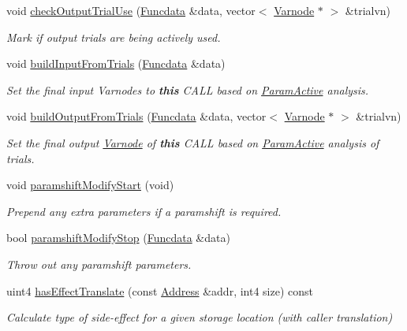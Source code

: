 \begin{DoxyCompactItemize}
void \mbox{\hyperlink{class_func_call_specs_a82c50f8299ce305411880fc61b8b1907}{check\+Output\+Trial\+Use}} (\mbox{\hyperlink{class_funcdata}{Funcdata}} \&data, vector$<$ \mbox{\hyperlink{class_varnode}{Varnode}} $\ast$ $>$ \&trialvn)
\begin{DoxyCompactList}\small\item\em Mark if output trials are being actively used. \end{DoxyCompactList}\item 
void \mbox{\hyperlink{class_func_call_specs_a1bb49b65cf036e8bc8b398e549b26a9c}{build\+Input\+From\+Trials}} (\mbox{\hyperlink{class_funcdata}{Funcdata}} \&data)
\begin{DoxyCompactList}\small\item\em Set the final input Varnodes to {\bfseries{this}} C\+A\+LL based on \mbox{\hyperlink{class_param_active}{Param\+Active}} analysis. \end{DoxyCompactList}\item 
void \mbox{\hyperlink{class_func_call_specs_a15f172165e29fbabfbb02be245ee1c98}{build\+Output\+From\+Trials}} (\mbox{\hyperlink{class_funcdata}{Funcdata}} \&data, vector$<$ \mbox{\hyperlink{class_varnode}{Varnode}} $\ast$ $>$ \&trialvn)
\begin{DoxyCompactList}\small\item\em Set the final output \mbox{\hyperlink{class_varnode}{Varnode}} of {\bfseries{this}} C\+A\+LL based on \mbox{\hyperlink{class_param_active}{Param\+Active}} analysis of trials. \end{DoxyCompactList}\item 
void \mbox{\hyperlink{class_func_call_specs_aac7bcd5ea5ed14adbe74b4ca4c7e0814}{paramshift\+Modify\+Start}} (void)
\begin{DoxyCompactList}\small\item\em Prepend any extra parameters if a paramshift is required. \end{DoxyCompactList}\item 
bool \mbox{\hyperlink{class_func_call_specs_a01e16ebebb71bdc63fb884c8d0e3b7e3}{paramshift\+Modify\+Stop}} (\mbox{\hyperlink{class_funcdata}{Funcdata}} \&data)
\begin{DoxyCompactList}\small\item\em Throw out any paramshift parameters. \end{DoxyCompactList}\item 
uint4 \mbox{\hyperlink{class_func_call_specs_a37a11cd8c631ed5b643eaf259b2ae49b}{has\+Effect\+Translate}} (const \mbox{\hyperlink{class_address}{Address}} \&addr, int4 size) const
\begin{DoxyCompactList}\small\item\em Calculate type of side-\/effect for a given storage location (with caller translation) \end{DoxyCompactList}\end{DoxyCompactItemize}
